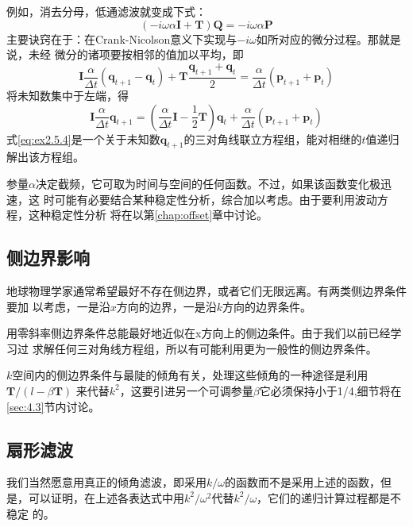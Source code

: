 例如，消去分母，低通滤波就变成下式：
\begin{equation}
(-i\omega\alpha\mathbf{I}+\mathbf{T})\mathbf{Q}=-i\omega\alpha\mathbf{P}
\label{eq:ex2.5.2}
\end{equation}
主要诀窍在于：在Crank-Nicolson意义下实现与$-i\omega$如所对应的微分过程。那就是说，未经
微分的诸项要按相邻的值加以平均，即
\begin{equation}
\mathbf{I}\frac{\alpha}{\Delta t}(\mathbf{q}_{t+1}-\mathbf{q}_{t})+
\mathbf{T}\frac{\mathbf{q}_{t+1}+\mathbf{q}_{t}}{2}=
\frac{\alpha}{\Delta t}(\mathbf{p}_{t+1}+\mathbf{p}_{t})
\label{eq:ex2.5.3}
\end{equation}
将未知数集中于左端，得
\begin{equation}
\mathbf{I}\frac{\alpha}{\Delta t}\mathbf{q}_{t+1}=
(\frac{\alpha}{\Delta t}\mathbf{I}-\frac{1}{2}\mathbf{T})\mathbf{q}_{t}+
\frac{\alpha}{\Delta t}(\mathbf{p}_{t+1}+\mathbf{p}_{t})
\label{eq:ex2.5.4}
\end{equation}
式\ref{eq:ex2.5.4}是一个关于未知数$\mathbf{q}_{t+1}$的三对角线联立方程组，能对相继的$t$值递归解出该方程组。

参量$\alpha$决定截频，它可取为时间与空间的任何函数。不过，如果该函数变化极迅速，这
时可能有必要结合某种稳定性分析，综合加以考虑。由于要利用波动方程，这种稳定性分析
将在以第\ref{chap:offset}章中讨论。

\subsection{侧边界影响}
\label{sec:2.5.3}

地球物理学家通常希望最好不存在侧边界，或者它们无限远离。有两类侧边界条件要加
以考虑，一是沿$x$方向的边界，一是沿$k$方向的边界条件。

用零斜率侧边界条件总能最好地近似在x方向上的侧边条件。由于我们以前已经学习过
求解任何三对角线方程组，所以有可能利用更为一般性的侧边界条件。

$k$空间内的侧边界条件与最陡的倾角有关，处理这些倾角的一种途径是利用$\mathbf{T}/
(l-\beta\mathbf{T})$
来代替$k^2$，这要引进另一个可调参量$\beta$它必须保持小于1/4,细节将在\ref{sec:4.3}节内讨论。

\subsection{扇形滤波}
\label{sec:2.5.4}

我们当然愿意用真正的倾角滤波，即采用$k/\omega$的函数而不是采用上述的函数，但
是，可以证明，在上述各表达式中用$k^2/\omega^2$代替$k^2/\omega$，它们的递归计算过程都是不稳定
的。

